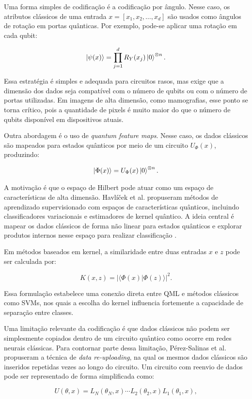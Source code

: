 \documentclass[
    12pt,
    openright,
    oneside,
    a4paper,
    english,
    brazil
]{abntex2}
\begin{document}
Uma forma simples de codificação é a codificação por ângulo. Nesse caso, os atributos clássicos de uma entrada \(x = [x_1, x_2, \ldots, x_d]\) são usados como ângulos de rotação em portas quânticas. Por exemplo, pode-se aplicar uma rotação em cada qubit:

\[
\ket{\psi(x)}
=
\prod_{j=1}^{d}
R_Y(x_j)
\ket{0}^{\otimes n}.
\]

Essa estratégia é simples e adequada para circuitos rasos, mas exige que a dimensão dos dados seja compatível com o número de qubits ou com o número de portas utilizadas. Em imagens de alta dimensão, como mamografias, esse ponto se torna crítico, pois a quantidade de pixels é muito maior do que o número de qubits disponível em dispositivos atuais.

Outra abordagem é o uso de \textit{quantum feature maps}. Nesse caso, os dados clássicos são mapeados para estados quânticos por meio de um circuito \(U_{\Phi}(x)\), produzindo:

\[
\ket{\Phi(x)} =
U_{\Phi}(x)\ket{0}^{\otimes n}.
\]

A motivação é que o espaço de Hilbert pode atuar como um espaço de características de alta dimensão. Havlíček et al. propuseram métodos de aprendizado supervisionado com espaços de características quânticos, incluindo classificadores variacionais e estimadores de kernel quântico. A ideia central é mapear os dados clássicos de forma não linear para estados quânticos e explorar produtos internos nesse espaço para realizar classificação \cite{havlicek2019supervised}.

Em métodos baseados em kernel, a similaridade entre duas entradas \(x\) e \(z\) pode ser calculada por:

\[
K(x,z) =
|\langle \Phi(x) | \Phi(z) \rangle|^2.
\]

Essa formulação estabelece uma conexão direta entre QML e métodos clássicos como SVMs, nos quais a escolha do kernel influencia fortemente a capacidade de separação entre classes.

Uma limitação relevante da codificação é que dados clássicos não podem ser simplesmente copiados dentro de um circuito quântico como ocorre em redes neurais clássicas. Para contornar parte dessa limitação, Pérez-Salinas et al. propuseram a técnica de \textit{data re-uploading}, na qual os mesmos dados clássicos são inseridos repetidas vezes ao longo do circuito. Um circuito com reenvio de dados pode ser representado de forma simplificada como:

\[
U(\theta, x)
=
L_N(\theta_N, x)
\cdots
L_2(\theta_2, x)
L_1(\theta_1, x),
\]
\end{document}
